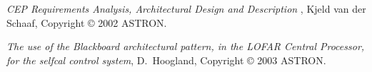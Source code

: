 \documentclass[]{lofar}
\begin{document}
  
  \begin{thebibliography}{WIDELABEL}

      \emph{CEP Requirements Analysis, Architectural Design and
      Description} , Kjeld van der Schaaf, Copyright \copyright{} 2002
      ASTRON. \label{LOFAR-ASTRON-MEM-035}

      \emph{The use of the Blackboard architectural pattern, in the LOFAR Central Processor, for the selfcal control system},
      D.\ Hoogland,
      Copyright \copyright{} 2003 ASTRON.
      \label{LOFAR-ASTRON-MEM-xxx}

  \end{thebibliography}
\end{document}
